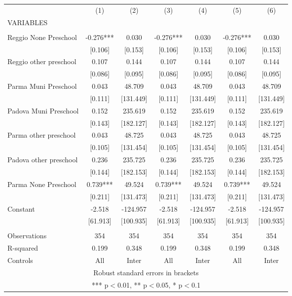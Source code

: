 \begin{tabular}{lcccccc} \hline
 & (1) & (2) & (3) & (4) & (5) & (6) \\
VARIABLES &  &  &  &  &  &  \\ \hline
 &  &  &  &  &  &  \\
Reggio None Preschool & -0.276*** & 0.030 & -0.276*** & 0.030 & -0.276*** & 0.030 \\
 & [0.106] & [0.153] & [0.106] & [0.153] & [0.106] & [0.153] \\
Reggio other preschool & 0.107 & 0.144 & 0.107 & 0.144 & 0.107 & 0.144 \\
 & [0.086] & [0.095] & [0.086] & [0.095] & [0.086] & [0.095] \\
Parma Muni Preschool & 0.043 & 48.709 & 0.043 & 48.709 & 0.043 & 48.709 \\
 & [0.111] & [131.449] & [0.111] & [131.449] & [0.111] & [131.449] \\
Padova Muni Preschool & 0.152 & 235.619 & 0.152 & 235.619 & 0.152 & 235.619 \\
 & [0.143] & [182.127] & [0.143] & [182.127] & [0.143] & [182.127] \\
Parma other preschool & 0.043 & 48.725 & 0.043 & 48.725 & 0.043 & 48.725 \\
 & [0.105] & [131.454] & [0.105] & [131.454] & [0.105] & [131.454] \\
Padova other preschool & 0.236 & 235.725 & 0.236 & 235.725 & 0.236 & 235.725 \\
 & [0.144] & [182.153] & [0.144] & [182.153] & [0.144] & [182.153] \\
Parma None Preschool & 0.739*** & 49.524 & 0.739*** & 49.524 & 0.739*** & 49.524 \\
 & [0.211] & [131.473] & [0.211] & [131.473] & [0.211] & [131.473] \\
Constant & -2.518 & -124.957 & -2.518 & -124.957 & -2.518 & -124.957 \\
 & [61.913] & [100.935] & [61.913] & [100.935] & [61.913] & [100.935] \\
 &  &  &  &  &  &  \\
Observations & 354 & 354 & 354 & 354 & 354 & 354 \\
R-squared & 0.199 & 0.348 & 0.199 & 0.348 & 0.199 & 0.348 \\
 Controls & All & Inter & All & Inter & All & Inter \\ \hline
\multicolumn{7}{c}{ Robust standard errors in brackets} \\
\multicolumn{7}{c}{ *** p$<$0.01, ** p$<$0.05, * p$<$0.1} \\
\end{tabular}

